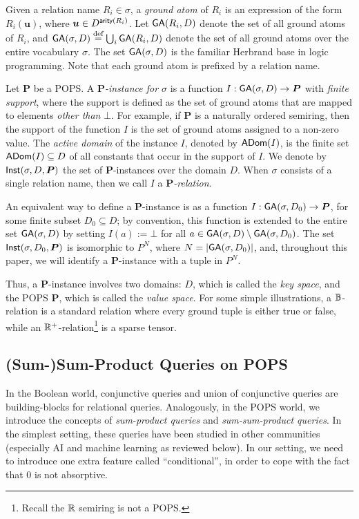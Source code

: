 Given a relation name $R_i \in \sigma$, a {\em ground atom} of $R_i$
is an expression of the form $R_i(\bm u)$, where
$\bm u \in D^{\textsf{arity}(R_i)}$.  Let $\textsf{GA}(R_i,D)$ denote the set of
all ground atoms of $R_i$, and
$\textsf{GA}(\sigma, D) \stackrel{\text{def}}{=} \bigcup_i \textsf{GA}(R_i,D)$ denote the set of
all ground atoms over the entire vocabulary $\sigma$.  The set
$\textsf{GA}(\sigma, D)$ is the familiar Herbrand base in logic
programming.  Note that each ground atom is prefixed by a relation
name.

Let $\bm P$ be a POPS.  A {\em $\bm P$-instance for $\sigma$} is a function
$I : \textsf{GA}(\sigma, D) \rightarrow \bm P$ with {\em finite support},
where the support is defined as the set of ground atoms that are
mapped to elements {\em other than} $\bot$.
For example, if $\bm P$ is a naturally ordered semiring, then the support of the function
$I$ is the set of ground atoms assigned to a non-zero value.
The {\em active domain} of the instance $I$,
denoted by $\textsf{ADom}(I)$, is the finite set $\textsf{ADom}(I) \subseteq D$ of all constants that occur
in the support of $I$.  We denote by $\textsf{Inst}(\sigma, D, \bm P)$ the set
of $\bm P$-instances over the domain $D$.  When $\sigma$ consists of a
single relation name, then we call $I$ a {\em $\bm P$-relation}.

An equivalent way to define a $\bm P$-instance is as a function
$I : \textsf{GA}(\sigma, D_0) \rightarrow \bm P$, for some finite subset
$D_0 \subseteq D$; by convention, this function is extended to the
entire set $\textsf{GA}(\sigma, D)$ by setting $I(a) := \bot$ for all
$a \in \textsf{GA}(\sigma,D) \setminus \textsf{GA}(\sigma,D_0)$.  The set
$\textsf{Inst}(\sigma, D_0, \bm P)$ is isomorphic to $P^N$, where
$N=|\textsf{GA}(\sigma, D_0)|$, and, throughout this paper, we will
identify a $\bm P$-instance with a tuple in $P^N$.

Thus, a $\bm P$-instance involves two domains: $D$, which is called
the {\em key space}, and the POPS $\bm P$, which is called the {\em
  value space}.  For some simple illustrations, a $\mathbb B$-relation is a
standard relation where every ground tuple is either true or false,
while an $\mathbb R^+$-relation\footnote{Recall the $\mathbb R$ semiring is not a POPS.} is a sparse tensor.

\subsection{(Sum-)Sum-Product Queries on POPS}
\label{subsec:sum-products}

In the Boolean world, conjunctive queries and union of conjunctive
queries are building-blocks for relational queries.  Analogously, in the POPS world,
we introduce the concepts of {\em sum-product queries} and {\em
  sum-sum-product queries}.
In the simplest setting, these queries
have been studied in other communities (especially AI and machine
learning as reviewed below).  In our setting, we need to introduce one
extra feature called ``conditional'', in order to cope with the fact
that $0$ is not absorptive.

